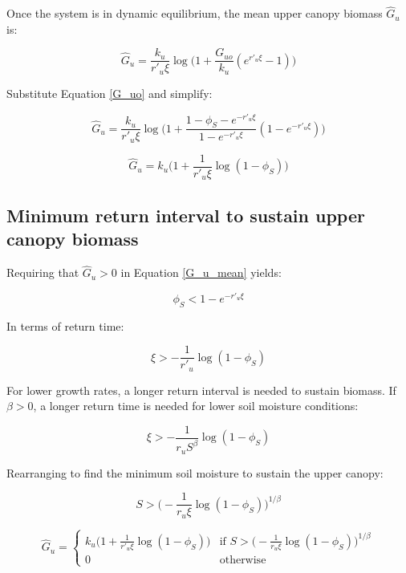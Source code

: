 \documentclass[12pt]{article}
\begin{document}
Once the system is in dynamic equilibrium, the mean upper canopy biomass $\hat G_u$ is:

\begin{equation}
\hat{G}_u =
 		 \frac{k_u}{r'_u \xi}\log \bigg(1 + \frac{G_{uo}}{k_u}( e^{r'_u \xi}-1)\bigg)
\end{equation}

Substitute Equation  \ref{G_uo} and simplify:

\begin{equation}
\hat{G}_u =
 \frac{k_u}{r'_u \xi}\log \big(1 +   \frac{1- \phi_S - e^{-r'_u \xi} }{1 - e^{-r'_u \xi}} ( 1 - e^{-r'_u \xi})\big)
\end{equation}

    
\begin{equation}
\hat{G}_u =
  k_u \big( 1 + \frac{1}{r'_u \xi} \log(1-\phi_S) \big)
		\label{G_u_mean}
\end{equation}


\subsection*{Minimum return interval to sustain upper canopy biomass}

Requiring that $\hat{G}_u >0$ in Equation \ref{G_u_mean} yields:

\begin{equation}
\phi_S < 1- e^{-r'_u \xi}
\end{equation}

In terms of return time:

\begin{equation}
\xi > - \frac{1}{r'_u}\log (1 - \phi_S) 
\end{equation}

For lower growth rates, a longer return interval is needed to sustain biomass.
If $\beta>0$, a longer return time is needed for lower soil moisture conditions:

\begin{equation}
\xi > - \frac{1}{r_u S^\beta}\log (1 - \phi_S)
\end{equation}

Rearranging to find the minimum soil moisture to sustain the upper canopy:
 
\begin{equation}
S > \bigg( - \frac{1}{r_u \xi }\log (1 - \phi_S)\bigg)^{1/\beta}
\end{equation}

\begin{equation}
\hat{G}_u  =
    \begin{cases}
       k_u \big( 1 + \frac{1}{r'_u \xi} \log(1-\phi_S) \big)
	  & \text{if  } S > \big( - \frac{1}{r_u \xi }\log (1 - \phi_S)\big)^{1/\beta}
		\\[10pt]
      0 & \text{otherwise}
    \end{cases}       
\end{equation}
\end{document}
